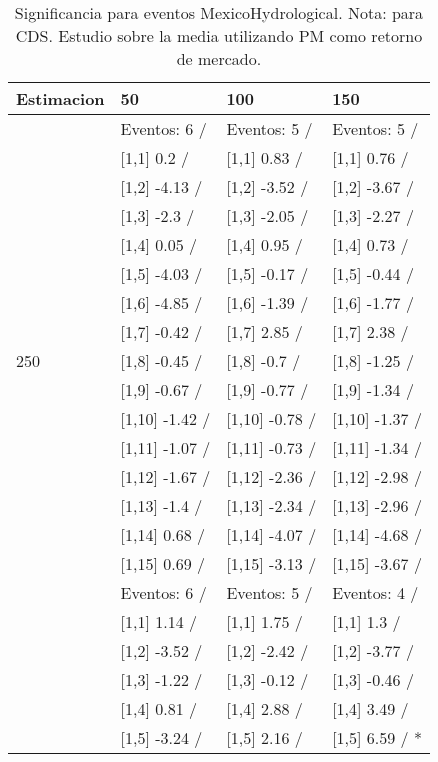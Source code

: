 \begin{table}

\caption{Significancia para eventos MexicoHydrological. Nota: para CDS. Estudio sobre la media utilizando PM como retorno de mercado.}
\centering
\begin{tabular}[t]{llll}
\toprule
Estimacion & 50 & 100 & 150\\
\midrule
 & Eventos:  6 / & Eventos:  5 / & Eventos:  5 /\\
 & {}[1,1] 0.2  / & {}[1,1] 0.83  / & {}[1,1] 0.76  /\\
 & {}[1,2] -4.13  / & {}[1,2] -3.52  / & {}[1,2] -3.67  /\\
 & {}[1,3] -2.3  / & {}[1,3] -2.05  / & {}[1,3] -2.27  /\\
 & {}[1,4] 0.05  / & {}[1,4] 0.95  / & {}[1,4] 0.73  /\\
\addlinespace
 & {}[1,5] -4.03  / & {}[1,5] -0.17  / & {}[1,5] -0.44  /\\
 & {}[1,6] -4.85  / & {}[1,6] -1.39  / & {}[1,6] -1.77  /\\
 & {}[1,7] -0.42  / & {}[1,7] 2.85  / & {}[1,7] 2.38  /\\
250 & {}[1,8] -0.45  / & {}[1,8] -0.7  / & {}[1,8] -1.25  /\\
 & {}[1,9] -0.67  / & {}[1,9] -0.77  / & {}[1,9] -1.34  /\\
\addlinespace
 & {}[1,10] -1.42  / & {}[1,10] -0.78  / & {}[1,10] -1.37  /\\
 & {}[1,11] -1.07  / & {}[1,11] -0.73  / & {}[1,11] -1.34  /\\
 & {}[1,12] -1.67  / & {}[1,12] -2.36  / & {}[1,12] -2.98  /\\
 & {}[1,13] -1.4  / & {}[1,13] -2.34  / & {}[1,13] -2.96  /\\
 & {}[1,14] 0.68  / & {}[1,14] -4.07  / & {}[1,14] -4.68  /\\
\addlinespace
 & {}[1,15] 0.69  / & {}[1,15] -3.13  / & {}[1,15] -3.67  /\\
 & Eventos:  6 / & Eventos:  5 / & Eventos:  4 /\\
 & {}[1,1] 1.14  / & {}[1,1] 1.75  / & {}[1,1] 1.3  /\\
 & {}[1,2] -3.52  / & {}[1,2] -2.42  / & {}[1,2] -3.77  /\\
 & {}[1,3] -1.22  / & {}[1,3] -0.12  / & {}[1,3] -0.46  /\\
\addlinespace
 & {}[1,4] 0.81  / & {}[1,4] 2.88  / & {}[1,4] 3.49  /\\
 & {}[1,5] -3.24  / & {}[1,5] 2.16  / & {}[1,5] 6.59  / *\\

\end{tabular}
\end{table}
